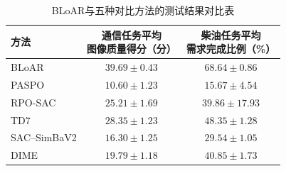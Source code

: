\begin{table}[H]
 \centering
 \caption{BLoAR与五种对比方法的测试结果对比表}
 \label{tab:formal-ch2-main}
 \begin{tabular}{lcc}
  \toprule
  方法 & \shortstack{通信任务平均\\图像质量得分（分）} & \shortstack{柴油任务平均\\需求完成比例（\%）} \\
  \midrule
   BLoAR & \(39.69\pm0.43\) & \(68.64\pm0.86\) \\
   PASPO & \(10.60\pm1.23\) & \(15.67\pm4.54\) \\
   RPO-SAC & \(25.21\pm1.69\) & \(39.86\pm17.93\) \\
   TD7 & \(28.35\pm1.23\) & \(48.35\pm1.28\) \\
   SAC--SimBaV2 & \(16.30\pm1.25\) & \(29.54\pm1.05\) \\
   DIME & \(19.79\pm1.18\) & \(40.85\pm1.73\) \\
  \bottomrule
 \end{tabular}
\end{table}
